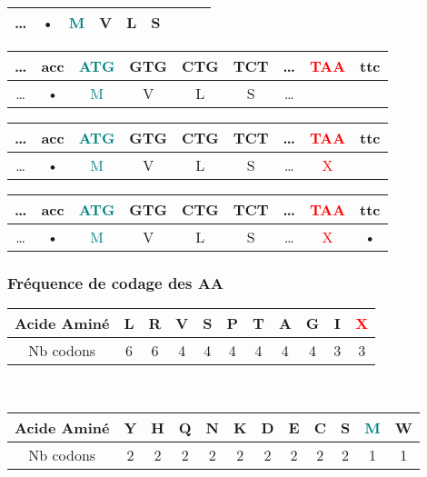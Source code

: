 \documentclass{beamer}
\begin{document}
\begin{frame}
\begin{overprint}
\begin{tabular}{|c|c|c|c|c|c|c|c|c|}
		\hline 
		\ldots & • & \textcolor{teal}{M} & V & L & S &  &  &  \\ 
		\hline 
	\end{tabular}
	\centering
	\begin{tabular}{|c|c|c|c|c|c|c|c|c|}
		\hline 
		\ldots & acc & \textcolor{teal}{ATG} & GTG & CTG & TCT & \ldots & \textcolor{red}{TAA} & ttc \\ 
		\hline 
		\ldots & • & \textcolor{teal}{M} & V & L & S & \ldots &  &  \\ 
		\hline 
	\end{tabular}
	\centering
	\begin{tabular}{|c|c|c|c|c|c|c|c|c|}
		\hline 
		\ldots & acc & \textcolor{teal}{ATG} & GTG & CTG & TCT & \ldots & \textcolor{red}{TAA} & ttc \\ 
		\hline 
		\ldots & • & \textcolor{teal}{M} & V & L & S & \ldots & \textcolor{red}{X} &  \\ 
		\hline 
	\end{tabular}
	\centering
	\begin{tabular}{|c|c|c|c|c|c|c|c|c|}
		\hline 
		\ldots & acc & \textcolor{teal}{ATG} & GTG & CTG & TCT & \ldots & \textcolor{red}{TAA} & ttc \\ 
		\hline 
		\ldots & • & \textcolor{teal}{M} & V & L & S & \ldots & \textcolor{red}{X} & • \\ 
		\hline 
	\end{tabular}
\end{overprint}
\end{frame}

\begin{frame}
\frametitle{Fréquence de codage des AA}
\begin{tabular}{|c|c|c|c|c|c|c|c|c|c|c|}
\hline 
Acide Aminé & L & R & V & S & P & T & A & G & I & \textcolor{red}{X}\\ 
\hline 
Nb codons & 6 & 6 & 4 & 4 & 4 & 4 & 4 & 4 & 3 & 3\\ 
\hline 
\end{tabular}\\
\vspace{30pt}
\begin{tabular}{|c|c|c|c|c|c|c|c|c|c|c|c|}
\hline 
Acide Aminé & Y & H & Q & N & K & D & E & C & S & \textcolor{teal}{M} & W \\ 
\hline 
Nb codons & 2 & 2 & 2 & 2 & 2 & 2 & 2 & 2 & 2 & 1 & 1 \\ 
\hline 
\end{tabular} 


\end{frame}
\end{document}
